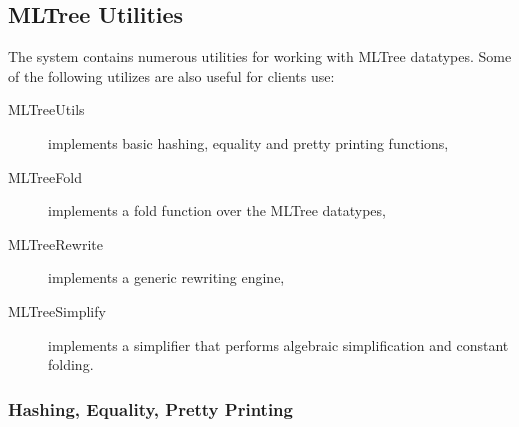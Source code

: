 \subsection{MLTree Utilities}

The \MLRISC{} system contains numerous utilities for working with
MLTree datatypes.  Some of the following utilizes are also useful for clients
use:
\begin{description}
  \item[MLTreeUtils] implements basic hashing, equality and pretty
printing functions,
  \item[MLTreeFold] implements a fold function over the MLTree datatypes,  
  \item[MLTreeRewrite] implements a generic rewriting engine,
  \item[MLTreeSimplify] implements a simplifier that performs algebraic
simplification and constant folding.
\end{description}
\subsubsection{Hashing, Equality, Pretty Printing}


